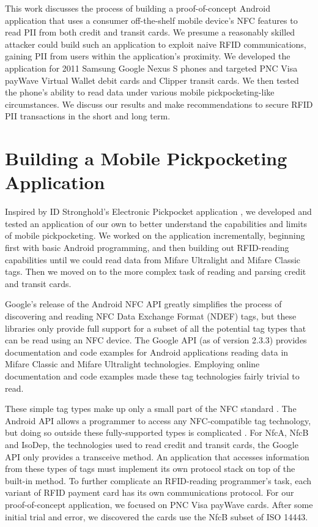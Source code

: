 \documentclass{sig-alternate}
\begin{document}
This work discusses the process of building a proof-of-concept Android application that uses a consumer off-the-shelf mobile device's NFC features to read PII from both credit and transit cards.  We presume a reasonably skilled attacker could build such an application to exploit naive RFID communications, gaining PII from users within the application's proximity.  We developed the application for 2011 Samsung Google Nexus S phones and targeted PNC Visa payWave Virtual Wallet debit cards and Clipper transit cards.  We then tested the phone's ability to read data under various mobile pickpocketing-like circumstances.  We discuss our results and make recommendations to secure RFID PII transactions in the short and long term.  

\section{Building a Mobile Pickpocketing Application}
Inspired by ID Stronghold's Electronic Pickpocket application \cite{google-play-idstronghold}, we developed and tested an application of our own to better understand the capabilities and limits of mobile pickpocketing.  We worked on the application incrementally, beginning first with basic Android programming, and then building out RFID-reading capabilities until we could read data from Mifare Ultralight and Mifare Classic tags.  Then we moved on to the more complex task of reading and parsing credit and transit cards.    

Google's release of the Android NFC API greatly simplifies the process of discovering and reading NFC Data Exchange Format (NDEF) tags, but these libraries only provide full support for a subset of all the potential tag types that can be read using an NFC device. The Google API (as of version 2.3.3) provides documentation and code examples for Android applications reading data in Mifare Classic and Mifare Ultralight technologies.  Employing online documentation and code examples \cite{mifare-classic-detection-android} made these tag technologies fairly trivial to read.

These simple tag types make up only a small part of the NFC standard \cite{opennfc-1}.  The Android API allows a programmer to access any NFC-compatible tag technology, but doing so outside these fully-supported types is complicated \cite{android-developers-advanced-nfc}.  For NfcA, NfcB and IsoDep, the technologies used to read credit and transit cards, the Google API only provides a transceive method.  An application that accesses information from these types of tags must implement its own protocol stack on top of the built-in method.  To further complicate an RFID-reading programmer's task, each variant of RFID payment card has its own communications protocol.  For our proof-of-concept application, we focused on PNC Visa payWave cards.  After some initial trial and error, we discovered the cards use the NfcB subset of ISO 14443.  
\end{document}
